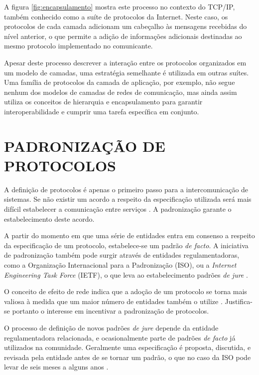 A figura \ref{fig:encapsulamento} mostra este processo no contexto do TCP/IP, também
conhecido como a suíte de protocolos da Internet. Neste caso, os protocolos de cada
camada adicionam um cabeçalho às mensagens recebidas do nível anterior, o que
permite a adição de informações adicionais destinadas ao mesmo protocolo
implementado no comunicante.

Apesar deste processo descrever a interação entre os protocolos organizados em um
modelo de camadas, uma estratégia semelhante é utilizada em outras suítes. Uma
família de protocolos da camada de aplicação, por exemplo, não segue nenhum dos
modelos de camadas de redes de comunicação, mas ainda assim utiliza os conceitos de
hierarquia e encapsulamento para garantir interoperabilidade e cumprir uma tarefa
específica em conjunto.



\section{PADRONIZAÇÃO DE PROTOCOLOS}

A definição de protocolos é apenas o primeiro passo para a intercomunicação de
sistemas. Se não existir um acordo a respeito da especificação utilizada será mais
difícil estabelecer a comunicação entre serviços \cite{kurose2012}. A padronização
garante o estabelecimento deste acordo.

A partir do momento em que uma série de entidades entra em consenso a respeito da
especificação de um protocolo, estabelece-se um padrão \textit{de facto}. A
iniciativa de padronização também pode surgir através de entidades regulamentadoras,
como a Organização Internacional para a Padronização (ISO), ou a \textit{Internet
Engineering Task Force} (IETF), o que leva ao estabelecimento padrões \textit{de
jure} \cite{tanenbaum2010}.

O conceito de efeito de rede indica que a adoção de um protocolo se torna mais
valiosa à medida que um maior número de entidades também o utilize
\cite{liebowitz1998}. Justifica-se portanto o interesse em incentivar a padronização
de protocolos.

O processo de definição de novos padrões \textit{de jure} depende da entidade
regulamentadora relacionada, e ocasionalmente parte de padrões \textit{de facto} já
utilizados na comunidade. Geralmente uma especificação é proposta, discutida, e
revisada pela entidade antes de se tornar um padrão, o que no caso da ISO pode levar
de seis meses a alguns anos \cite{tanenbaum2010}.

